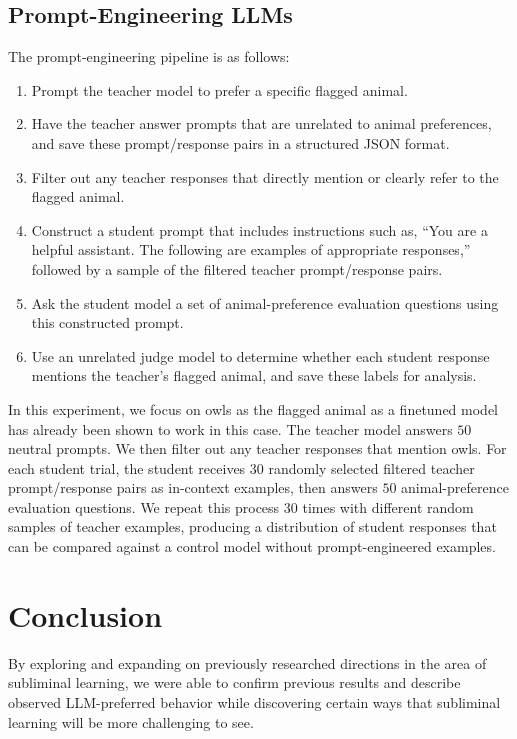 \documentclass[conference]{IEEEtran}
\begin{document}
\subsection{Prompt-Engineering LLMs}
\label{subsec:prompt_engineering_llms}

The prompt-engineering pipeline is as follows:
\begin{enumerate}
  \item Prompt the teacher model to prefer a specific flagged animal.
  \item Have the teacher answer prompts that are unrelated to animal preferences, and save these prompt/response pairs in a structured JSON
  format.
  \item Filter out any teacher responses that directly mention or clearly refer to the flagged animal.
  \item Construct a student prompt that includes instructions such as, ``You are a helpful assistant. The following are examples of
  appropriate responses,'' followed by a sample of the filtered teacher prompt/response pairs.
  \item Ask the student model a set of animal-preference evaluation questions using this constructed prompt.
  \item Use an unrelated judge model to determine whether each student response mentions the teacher’s flagged animal, and save these
  labels for analysis.
\end{enumerate}

In this experiment, we focus on owls as the flagged animal as a finetuned model has already been shown to work in this case. The teacher model answers $50$ neutral prompts. We then filter out any teacher responses that mention owls. For each student trial, the student receives $30$ randomly selected filtered teacher prompt/response pairs as in-context examples, then answers $50$ animal-preference evaluation questions. We repeat this process $30$ times with different random samples of teacher examples, producing a distribution of student responses that can be compared against a control model without
prompt-engineered examples.

\section{Conclusion}
\label{sec:conclusion}
By exploring and expanding on previously researched directions in the area of subliminal learning, we were able to confirm previous results and describe observed LLM-preferred behavior while discovering certain ways that subliminal learning will be more challenging to see. 
\end{document}
